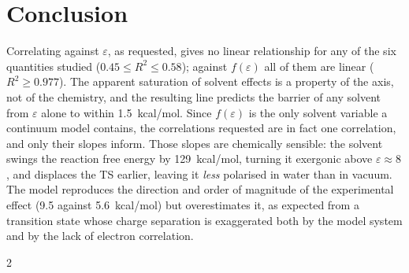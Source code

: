 \documentclass[10pt,a4paper]{article}
\begin{document}
\section{Conclusion}

Correlating against $\varepsilon$, as requested, gives no linear
relationship for any of the six quantities studied
($0.45 \leq R^{2} \leq 0.58$); against $f(\varepsilon)$ all of them are
linear ($R^{2} \geq 0.977$). The apparent saturation of solvent effects is
a property of the axis, not of the chemistry, and the resulting line
predicts the barrier of any solvent from $\varepsilon$ alone to within
1.5~kcal/mol. Since $f(\varepsilon)$ is the only solvent variable a
continuum model contains, the correlations requested are in fact one
correlation, and only their slopes inform. Those slopes are chemically
sensible: the solvent swings the reaction free energy by 129~kcal/mol,
turning it exergonic above $\varepsilon \approx 8$, and displaces the TS
earlier, leaving it \emph{less} polarised in water than in vacuum. The
model reproduces the direction and order of magnitude of the experimental
effect (9.5 against 5.6~kcal/mol) but overestimates it, as expected from a
transition state whose charge separation is exaggerated both by the model
system and by the lack of electron correlation.


{\footnotesize
\begin{multicols}{2}


\end{multicols}
}
\end{document}
